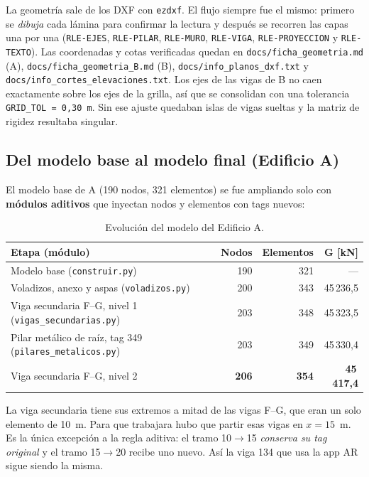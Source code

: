 \documentclass[11pt,a4paper]{article}
\begin{document}
La geometría sale de los DXF con \texttt{ezdxf}. El flujo siempre fue el mismo:
primero se \emph{dibuja} cada lámina para confirmar la lectura y después se
recorren las capas una por una (\texttt{RLE-EJES}, \texttt{RLE-PILAR},
\texttt{RLE-MURO}, \texttt{RLE-VIGA}, \texttt{RLE-PROYECCION} y
\texttt{RLE-TEXTO}). Las coordenadas y cotas verificadas quedan en
\texttt{docs/ficha\_geometria.md} (A), \texttt{docs/ficha\_geometria\_B.md} (B),
\texttt{docs/info\_planos\_dxf.txt} y \texttt{docs/info\_cortes\_elevaciones.txt}.
Los ejes de las vigas de B no caen exactamente sobre los ejes de la grilla, así
que se consolidan con una tolerancia \texttt{GRID\_TOL = 0,30~m}. Sin ese ajuste
quedaban islas de vigas sueltas y la matriz de rigidez resultaba singular.

\subsection{Del modelo base al modelo final (Edificio A)}

El modelo base de A (190 nodos, 321 elementos) se fue ampliando solo con
\textbf{módulos aditivos} que inyectan nodos y elementos con tags nuevos:

\begin{table}[h]
\centering
\caption{Evolución del modelo del Edificio A.}
\begin{tabularx}{\textwidth}{Xrrr}
\toprule
Etapa (módulo) & Nodos & Elementos & G [kN] \\
\midrule
Modelo base (\texttt{construir.py}) & 190 & 321 & --- \\
Voladizos, anexo y aspas (\texttt{voladizos.py}) & 200 & 343 & 45\,236,5 \\
Viga secundaria F--G, nivel 1 (\texttt{vigas\_secundarias.py}) & 203 & 348 & 45\,323,5 \\
Pilar metálico de raíz, tag 349 (\texttt{pilares\_metalicos.py}) & 203 & 349 & 45\,330,4 \\
Viga secundaria F--G, nivel 2 & \textbf{206} & \textbf{354} & \textbf{45\,417,4} \\
\bottomrule
\end{tabularx}
\end{table}

La viga secundaria tiene sus extremos a mitad de las vigas F--G, que eran un
solo elemento de 10~m. Para que trabajara hubo que partir esas vigas en
$x = 15$~m. Es la única excepción a la regla aditiva: el tramo 10$\to$15
\emph{conserva su tag original} y el tramo 15$\to$20 recibe uno nuevo. Así la
viga 134 que usa la app AR sigue siendo la misma.
\end{document}
